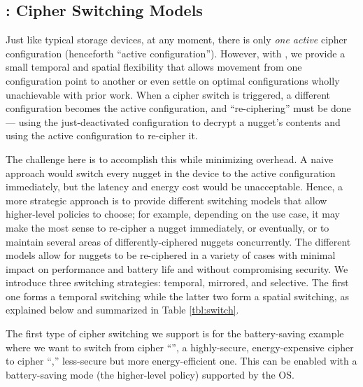 \subsection{\sysA: Cipher Switching Models}\label{subsec:des-switch}

Just like typical storage devices, at any moment, there is only {\em one active}
cipher configuration (henceforth ``active configuration''). However, with \sysA,
we provide a small temporal and spatial flexibility that allows movement from
one configuration point to another or even settle on optimal configurations
wholly unachievable with prior work. When a cipher switch is triggered, a
different configuration becomes the active configuration, and ``re-ciphering''
must be done --- using the just-deactivated configuration to decrypt a nugget's
contents and using the active configuration to re-cipher it.

The challenge here is to accomplish this while minimizing overhead. A naive
approach would switch every nugget in the device to the active configuration
immediately, but the latency and energy cost would be unacceptable. Hence, a
more strategic approach is to provide different switching models that allow
higher-level policies to choose; for example, depending on the use case, it may
make the most sense to re-cipher a nugget immediately, or eventually, or to
maintain several areas of differently-ciphered nuggets concurrently. The
different models allow for nuggets to be re-ciphered in a variety of cases with
minimal impact on performance and battery life and without compromising
security. We introduce three switching strategies: temporal, mirrored, and
selective. The first one forms a temporal switching while the latter two form a
spatial switching, as explained below and summarized in Table \cref{tbl:switch}.




 The first type of cipher switching we support is for
the battery-saving example where we want to switch from cipher ``\cone'', a
highly-secure, energy-expensive cipher to cipher ``\ctwo,'' less-secure but more
energy-efficient one. This can be enabled with a battery-saving mode (the
higher-level policy) supported by the OS.

